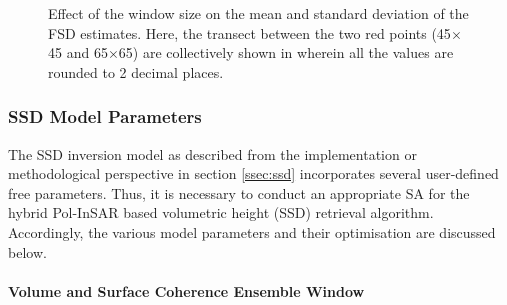 \documentclass[review]{elsarticle}
\numberwithin{equation}{section}
\numberwithin{figure}{section}
\numberwithin{table}{section}
\begin{document}
\begin{figure}[htb]
\begin{subfigure}[t]{0.49\textwidth}
        \caption{}
        \label{subfig:fwindow_var}
    \end{subfigure}
    \begin{subfigure}[t]{0.49\textwidth}
        \caption{}
        \label{subfig:fwindow_transect}
    \end{subfigure}
    \caption{Effect of the window size on the  mean and  standard deviation of the FSD estimates. Here, the transect between the two red points (45$\times$45 and 65$\times$65) are collectively shown in  wherein all the values are rounded to 2 decimal places.}
    \label{fig:fsd_res}
\end{figure}

\subsubsection{SSD Model Parameters}
The SSD inversion model as described from the implementation or methodological perspective in section \ref{ssec:ssd} incorporates several user-defined free parameters. Thus, it is necessary to conduct an appropriate SA for the hybrid Pol-InSAR based volumetric height (SSD) retrieval algorithm. Accordingly, the various model parameters and their optimisation are discussed below.

\paragraph*{Volume and Surface Coherence Ensemble Window}
\end{document}
